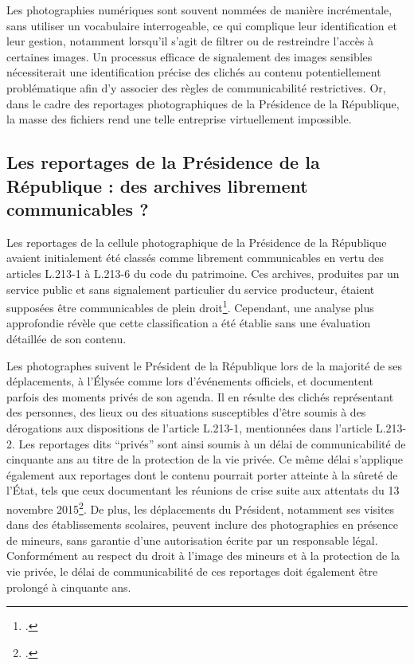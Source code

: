 Les photographies numériques sont souvent nommées de manière incrémentale, sans utiliser un vocabulaire interrogeable, ce qui complique leur identification et leur gestion, notamment lorsqu'il s'agit de filtrer ou de restreindre l'accès à certaines images. Un processus efficace de signalement des images sensibles nécessiterait une identification précise des clichés au contenu potentiellement problématique afin d'y associer des règles de communicabilité restrictives. Or, dans le cadre des reportages photographiques de la Présidence de la République, la masse des fichiers rend une telle entreprise virtuellement impossible.

\subsection*{Les reportages de la Présidence de la République : des archives librement communicables ?}

Les reportages de la cellule photographique de la Présidence de la République avaient initialement été classés comme librement communicables en vertu des articles L.213-1 à L.213-6 du code du patrimoine. Ces archives, produites par un service public et sans signalement particulier du service producteur, étaient supposées être communicables de plein droit\footcite{articleL2131CodePatrimoine}. Cependant, une analyse plus approfondie révèle que cette classification a été établie sans une évaluation détaillée de son contenu.

Les photographes suivent le Président de la République lors de la majorité de ses déplacements, à l'Élysée comme lors d'événements officiels, et documentent parfois des moments privés de son agenda. Il en résulte des clichés représentant des personnes, des lieux ou des situations susceptibles d'être soumis à des dérogations aux dispositions de l'article L.213-1, mentionnées dans l'article L.213-2. Les reportages dits \enquote{privés} sont ainsi soumis à un délai de communicabilité de cinquante ans au titre de la protection de la vie privée. Ce même délai s'applique également aux reportages dont le contenu pourrait porter atteinte à la sûreté de l'État, tels que ceux documentant les réunions de crise suite aux attentats du 13 novembre 2015\footcite{articleL2132CodePatrimoine}. De plus, les déplacements du Président, notamment ses visites dans des établissements scolaires, peuvent inclure des photographies en présence de mineurs, sans garantie d'une autorisation  écrite par un responsable légal. Conformément au respect du droit à l'image des mineurs et à la protection de la vie privée, le délai de communicabilité de ces reportages doit également être prolongé à cinquante ans.


